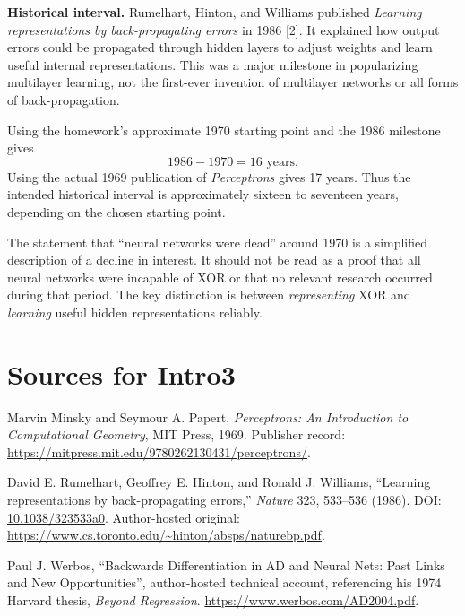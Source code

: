 \documentclass[11pt,a4paper]{article}
\begin{document}
\textbf{Historical interval.} Rumelhart, Hinton, and Williams published \emph{Learning representations by back-propagating errors} in 1986 [2]. It explained how output errors could be propagated through hidden layers to adjust weights and learn useful internal representations. This was a major milestone in popularizing multilayer learning, not the first-ever invention of multilayer networks or all forms of back-propagation.

Using the homework's approximate 1970 starting point and the 1986 milestone gives
\[
1986-1970=\boxed{16\text{ years}}.
\]
Using the actual 1969 publication of \emph{Perceptrons} gives 17 years. Thus the intended historical interval is approximately sixteen to seventeen years, depending on the chosen starting point.

The statement that ``neural networks were dead'' around 1970 is a simplified description of a decline in interest. It should not be read as a proof that all neural networks were incapable of XOR or that no relevant research occurred during that period. The key distinction is between \emph{representing} XOR and \emph{learning} useful hidden representations reliably.

\section*{Sources for Intro3}
\begin{enumerate}[label={[\arabic*]}]
\item Marvin Minsky and Seymour A. Papert, \emph{Perceptrons: An Introduction to Computational Geometry}, MIT Press, 1969. Publisher record: \url{https://mitpress.mit.edu/9780262130431/perceptrons/}.
\item David E. Rumelhart, Geoffrey E. Hinton, and Ronald J. Williams, ``Learning representations by back-propagating errors,'' \emph{Nature} 323, 533--536 (1986). DOI: \href{https://doi.org/10.1038/323533a0}{10.1038/323533a0}. Author-hosted original: \url{https://www.cs.toronto.edu/~hinton/absps/naturebp.pdf}.
\item Paul J. Werbos, ``Backwards Differentiation in AD and Neural Nets: Past Links and New Opportunities'', author-hosted technical account, referencing his 1974 Harvard thesis, \emph{Beyond Regression}. \url{https://www.werbos.com/AD2004.pdf}.
\end{enumerate}
\end{document}
